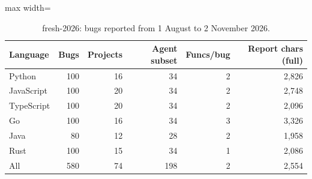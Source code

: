 \begin{table}[t]
\centering
\small
\caption{fresh-2026: bugs reported from 1 August to 2 November 2026.}
\label{tab:dataset}
\begin{adjustbox}{max width=\linewidth}\begin{tabular}{lrrrrr}
\toprule
Language & Bugs & Projects & Agent subset & Funcs/bug & Report chars (full) \\
\midrule
Python & 100 & 16 & 34 & 2 & 2,826 \\
JavaScript & 100 & 20 & 34 & 2 & 2,748 \\
TypeScript & 100 & 20 & 34 & 2 & 2,096 \\
Go & 100 & 16 & 34 & 3 & 3,326 \\
Java & 80 & 12 & 28 & 2 & 1,958 \\
Rust & 100 & 15 & 34 & 1 & 2,086 \\
\midrule
All & 580 & 74 & 198 & 2 & 2,554 \\
\bottomrule
\end{tabular}\end{adjustbox}
\end{table}
